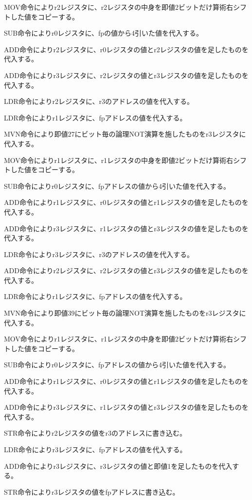 \documentclass{jsarticle}
\begin{document}
MOV命令によりr2レジスタに、r2レジスタの中身を即値2ビットだけ算術右シフトした値をコピーする。

SUB命令によりr0レジスタに、fpの値から4引いた値を代入する。

ADD命令によりr2レジスタに、r0レジスタの値とr2レジスタの値を足したものを代入する。

ADD命令によりr3レジスタに、r2レジスタの値とr3レジスタの値を足したものを代入する。

LDR命令によりr2レジスタに、r3のアドレスの値を代入する。

LDR命令によりr1レジスタに、fpアドレスの値を代入する。

MVN命令により即値27にビット毎の論理NOT演算を施したものをr3レジスタに代入する。

MOV命令によりr1レジスタに、r1レジスタの中身を即値2ビットだけ算術右シフトした値をコピーする。

SUB命令によりr0レジスタに、fpアドレスの値から4引いた値を代入する。

ADD命令によりr1レジスタに、r0レジスタの値とr1レジスタの値を足したものを代入する。

ADD命令によりr3レジスタに、r1レジスタの値とr3レジスタの値を足したものを代入する。

LDR命令によりr3レジスタに、r3のアドレスの値を代入する。

ADD命令によりr2レジスタに、r2レジスタの値とr3レジスタの値を足したものを代入する。

LDR命令によりr1レジスタに、fpアドレスの値を代入する。

MVN命令により即値39にビット毎の論理NOT演算を施したものをr3レジスタに代入する。

MOV命令によりr1レジスタに、r1レジスタの中身を即値2ビットだけ算術右シフトした値をコピーする。

SUB命令によりr0レジスタに、fpアドレスの値から4引いた値を代入する。

ADD命令によりr1レジスタに、r0レジスタの値とr1レジスタの値を足したものを代入する。

ADD命令によりr3レジスタに、r1レジスタの値とr3レジスタの値を足したものを代入する。

STR命令によりr2レジスタの値をr3のアドレスに書き込む。

LDR命令によりr3レジスタに、fpアドレスの値を代入する。

ADD命令によりr3レジスタに、r3レジスタの値と即値1を足したものを代入する。

STR命令によりr3レジスタの値をfpアドレスに書き込む。
\end{document}
